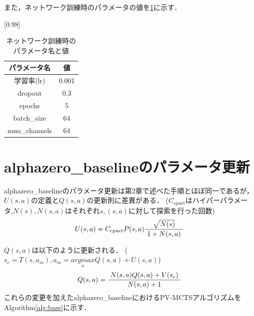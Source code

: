 また，ネットワーク訓練時のパラメータの値を\ref{table:param-train}に示す．
\begin{table}[H]
	\caption{ネットワーク訓練時のパラメータ名と値}
	\centering
	\scalebox{0.98}[0.98]{
		\begin{tabular}{c|c}
			パラメータ名 & 値 \\ \hline
			学習率(lr)    & 0.001 \\ 
			dropout    & 0.3 \\
			epochs      & 5 \\
			batch\_size     & 64 \\
			num\_channels  & 64 \\
		\end{tabular}
	}
	\label{table:param-train}
\end{table}
\section{alphazero\_baselineのパラメータ更新}
alphazero\_baselineのパラメータ更新は第2章で述べた手順とほぼ同一であるが，$U(s, a)$の定義と$Q(s, a)$の更新則に差異がある．
($ C_{\textrm{cpuct}}$はハイパーパラメータ,$N(s), N(s, a)はそれぞれs,(s, a)に対して探索を行った回数$)
\begin{equation}
	{U(s, a)= C_{\textrm{cpuct}}P(s, a)\frac{\sqrt{N(s)}}{1+N(s, a)}\\
	}
\end{equation}

$Q(s, a)$は以下のように更新される．
($s_c = T(s, a_m), a_m = \underset{a}{argmax}{Q(s, a)+U(s, a)}$)
\begin{equation}
	{Q(s, a)=\frac{N(s, a)Q(s, a)+V(s_c)}{N(s, a)+1}\\
	}
\end{equation}
これらの変更を加えたalphazero\_baselineにおけるPV-MCTSアルゴリズムをAlgorithm\ref{alg:base}に示す．
\newpage

